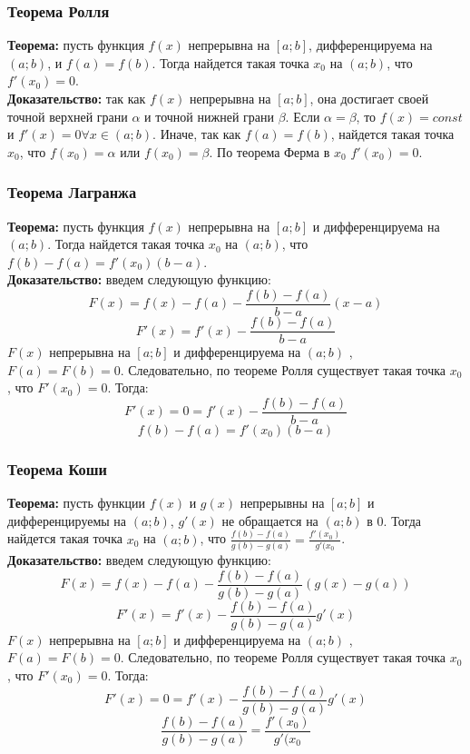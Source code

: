 \documentclass{article}
\newcommand{\theorem}{\textbf{Теорема:} }
\newcommand{\proof}{\textbf{Доказательство:} }
\newcommand{\intr}[2]{$(#1;#2)$}
\newcommand{\otr}[2]{$[#1;#2]$}
\begin{document}
        \subsubsection*{Теорема Ролля}
        \theorem пусть функция $f(x)$ непрерывна на \otr{a}{b}, дифференцируема на \intr{a}{b}, и $f(a) = f(b)$.
        Тогда найдется такая точка $x_0$ на \intr{a}{b}, что $f'(x_0) = 0$.
        \\
        \proof так как $f(x)$ непрерывна на \otr{a}{b}, она достигает своей точной верхней грани $\alpha$ и точной нижней грани $\beta$.
        Если $\alpha = \beta$, то $f(x) = const$ и $f'(x) = 0 \forall x \in (a;b)$.
        Иначе, так как $f(a) = f(b)$, найдется такая точка $x_0$, что $f(x_0) = \alpha$ или $f(x_0) = \beta$.
        По теорема Ферма в $x_0$ $f'(x_0) = 0$.
        
        \subsubsection*{Теорема Лагранжа}
        \theorem пусть функция $f(x)$ непрерывна на \otr{a}{b} и дифференцируема на \intr{a}{b}.
        Тогда найдется такая точка $x_0$ на \intr{a}{b}, что $ f(b) - f(a) = f'(x_0) (b - a) $.
        \\
        \proof введем следующую функцию:
        \[ F(x) = f(x) - f(a) - \frac{f(b) - f(a)}{b - a}(x - a) \]
        \[ F'(x) = f'(x) - \frac{f(b) - f(a)}{b - a} \]
        $F(x)$ непрерывна на \otr{a}{b} и дифференцируема на \intr{a}{b} , $F(a) = F(b) = 0$. Следовательно, по теореме Ролля существует такая точка
        $x_0$, что $F'(x_0) = 0$. Тогда:
        \[ F'(x) = 0 = f'(x) - \frac{f(b) - f(a)}{b - a} \]
        \[ f(b) - f(a) = f'(x_0) (b - a) \]

        \subsubsection*{Теорема Коши}
        \theorem пусть функции $f(x)$ и $g(x)$ непрерывны на \otr{a}{b} и дифференцируемы на \intr{a}{b}, $g'(x)$ не обращается на \intr{a}{b} в $0$.
        Тогда найдется такая точка $x_0$ на \intr{a}{b}, что $ \frac{f(b) - f(a)}{g(b) - g(a)} = \frac{f'(x_0)}{g'(x_0} $.
        \\
        \proof введем следующую функцию:
        \[ F(x) = f(x) - f(a) - \frac{f(b) - f(a)}{g(b) - g(a)}(g(x) - g(a)) \]
        \[ F'(x) = f'(x) - \frac{f(b) - f(a)}{g(b) - g(a)} g'(x) \]
        $F(x)$ непрерывна на \otr{a}{b} и дифференцируема на \intr{a}{b} , $F(a) = F(b) = 0$. Следовательно, по теореме Ролля существует такая точка
        $x_0$, что $F'(x_0) = 0$. Тогда:
        \[ F'(x) = 0 = f'(x) - \frac{f(b) - f(a)}{g(b) - g(a)} g'(x) \]
        \[ \frac{f(b) - f(a)}{g(b) - g(a)} = \frac{f'(x_0)}{g'(x_0} \]
        
\end{document}
